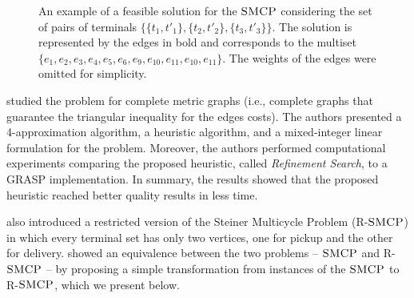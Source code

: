 \begin{figure}[H]
    \centering
{}
    \caption{An example of a feasible solution for the \(\textsc{SMCP}\) considering the set of pairs of terminals \(\{\{t_1, t'_1\}, \{t_2, t'_2\}, \{t_3, t' _3\}\}\). The solution is represented by the edges in bold and corresponds to the multiset \(\{e_1, e_2, e_3, e_4, e_5, e_6, e_9, e_{10}, e_{11}, e_{10}, e_{11}\}\). The weights of the edges were omitted for simplicity.}
    \label{fig:exem_multicycle}
\end{figure}

\cite{Pereira2018TheSM} studied the problem for complete metric graphs (i.e., complete graphs that guarantee the triangular inequality for the edges costs). The authors presented a 4-approximation algorithm, a heuristic algorithm, and a mixed-integer linear formulation for the problem.
Moreover, the authors performed computational experiments comparing the proposed heuristic, called \textit{Refinement Search}, to a GRASP implementation. In summary, the results showed that the proposed heuristic reached better quality results in less time.

\citeauthor{Pereira2018TheSM} also introduced a restricted version of the Steiner Multicycle Problem (R-\(\textsc{SMCP}\)) in which every terminal set has only two vertices, one for pickup and the other for delivery. \cite{LINTZMAYER2020134} showed an equivalence between the two problems -- \(\textsc{SMCP}\) and R-\(\textsc{SMCP}\) -- by proposing a simple transformation from instances of the \(\textsc{SMCP}\) to R-\(\textsc{SMCP}\), which we present below. 


